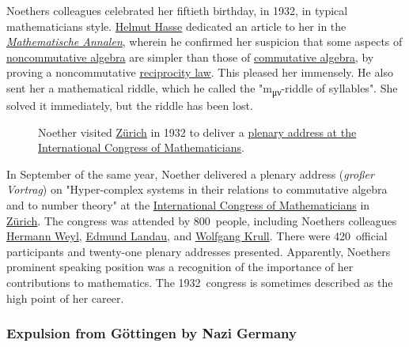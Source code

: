 Noether\textquotesingle s colleagues celebrated her fiftieth birthday, in 1932, in typical mathematicians\textquotesingle{} style. \href{https://en.wikipedia.org/wiki/Helmut_Hasse}{Helmut Hasse} dedicated an article to her in the \emph{\href{https://en.wikipedia.org/wiki/Mathematische_Annalen}{Mathematische Annalen}}, wherein he confirmed her suspicion that some aspects of \href{https://en.wikipedia.org/wiki/Noncommutative_algebra}{noncommutative algebra} are simpler than those of \href{https://en.wikipedia.org/wiki/Commutative_algebra}{commutative algebra}, by proving a noncommutative \href{https://en.wikipedia.org/wiki/Quadratic_reciprocity}{reciprocity law}. This pleased her immensely. He also sent her a mathematical riddle, which he called the "m\textsubscript{μν}-riddle of syllables". She solved it immediately, but the riddle has been lost.

\begin{figure}
\centering
\caption{Noether visited \href{https://en.wikipedia.org/wiki/Zürich}{Zürich} in 1932 to deliver a \href{https://en.wikipedia.org/wiki/Plenary_address_at_the_International_Congress_of_Mathematicians}{plenary address at the International Congress of Mathematicians}.}\label{mwBEI}
\end{figure}

In September of the same year, Noether delivered a plenary address (\emph{großer Vortrag}) on "Hyper-complex systems in their relations to commutative algebra and to number theory" at the \href{https://en.wikipedia.org/wiki/International_Congress_of_Mathematicians}{International Congress of Mathematicians} in \href{https://en.wikipedia.org/wiki/Zürich}{Zürich}. The congress was attended by 800{~}people, including Noether\textquotesingle s colleagues \href{https://en.wikipedia.org/wiki/Hermann_Weyl}{Hermann Weyl}, \href{https://en.wikipedia.org/wiki/Edmund_Landau}{Edmund Landau}, and \href{https://en.wikipedia.org/wiki/Wolfgang_Krull}{Wolfgang Krull}. There were 420{~}official participants and twenty-one plenary addresses presented. Apparently, Noether\textquotesingle s prominent speaking position was a recognition of the importance of her contributions to mathematics. The 1932{~}congress is sometimes described as the high point of her career.


\subsubsection[Expulsion from Göttingen by Nazi Germany]{\texorpdfstring{\protect\hypertarget{Expulsion_from_G.C3.B6ttingen_by_Nazi_Germany}{}{}Expulsion from Göttingen by Nazi Germany}{Expulsion from Göttingen by Nazi Germany}}\label{Expulsion_from_Guxf6ttingen_by_Nazi_Germany}

